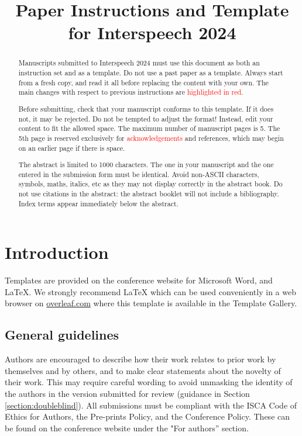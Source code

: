 \documentclass{Interspeech2024}
\title{Paper Instructions and Template for Interspeech 2024}
\newcommand{\red}[1]{\textcolor{red}{#1}}
\begin{document}
\maketitle

\begin{abstract}
    
    Manuscripts submitted to Interspeech 2024 must use this document as both an instruction set and as a template. Do not use a past paper as a template. Always start from a fresh copy, and read it all before replacing the content with your own. The main changes with respect to previous instructions are \red{highlighted in red}.
    
    Before submitting, check that your manuscript conforms to this template. If it does not, it may be rejected. Do not be tempted to adjust the format! Instead, edit your content to fit the allowed space. The maximum number of manuscript pages is 5. The 5th page is reserved exclusively for \red{acknowledgements} and references, which may begin on an earlier page if there is space.
    
    The abstract is limited to 1000 characters. The one in your manuscript and the one entered in the submission form must be identical. Avoid non-ASCII characters, symbols, maths, italics, etc as they may not display correctly in the abstract book. Do not use citations in the abstract: the abstract booklet will not include a bibliography.  Index terms appear immediately below the abstract. 
\end{abstract}




\section{Introduction}

Templates are provided on the conference website for Microsoft Word\textregistered, and \LaTeX. We strongly recommend \LaTeX\xspace
which can be used conveniently in a web browser on \url{overleaf.com} where this template is available in the Template Gallery.

\subsection{General guidelines}

Authors are encouraged to describe how their work relates to prior work by themselves and by others, and to make clear statements about the novelty of their work. This may require careful wording to avoid unmasking the identity of the authors in the version submitted for review (guidance in Section \ref{section:doubleblind}). All submissions must be compliant with the ISCA Code of Ethics for Authors, the Pre-prints Policy, and the Conference Policy. These can be found on the conference website under the "For authors'' section.
\end{document}
